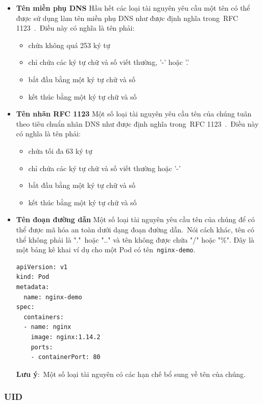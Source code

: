 \documentclass[12pt,a4paper]{report}
\begin{document}
	\begin{itemize}
		\item \textbf{Tên miền phụ DNS}
		\subitem Hầu hết các loại tài nguyên yêu cầu một tên có thể được sử dụng làm tên miền phụ DNS như được định nghĩa trong RFC 1123 . Điều này có nghĩa là tên phải:
		\begin{itemize}
			\item chứa không quá 253 ký tự
			\item chỉ chứa các ký tự chữ và số viết thường, '-' hoặc '.'
			\item bắt đầu bằng một ký tự chữ và số
			\item kết thúc bằng một ký tự chữ và số
		\end{itemize}
	
		\item \textbf{Tên nhãn RFC 1123}
		\subitem Một số loại tài nguyên yêu cầu tên của chúng tuân theo tiêu chuẩn nhãn DNS như được định nghĩa trong RFC 1123 . Điều này có nghĩa là tên phải:
		\begin{itemize}
			\item chứa tối đa 63 ký tự
			\item chỉ chứa các ký tự chữ và số viết thường hoặc '-'
			\item bắt đầu bằng một ký tự chữ và số
			\item kết thúc bằng một ký tự chữ và số
		\end{itemize}
	
		\item \textbf{Tên đoạn đường dẫn}
		\subitem Một số loại tài nguyên yêu cầu tên của chúng để có thể được mã hóa an toàn dưới dạng đoạn đường dẫn. Nói cách khác, tên có thể không phải là "." hoặc ".." và tên không được chứa "/" hoặc "\%".
		\subitem Đây là một bảng kê khai ví dụ cho một Pod có tên \texttt{nginx-demo}.
		\smallskip
\begin{lstlisting}[language=Bash]
apiVersion: v1
kind: Pod
metadata:
  name: nginx-demo
spec:
  containers:
  - name: nginx
    image: nginx:1.14.2
    ports:
    - containerPort: 80
\end{lstlisting}
	\smallskip
	\subitem \textbf{Lưu ý}: Một số loại tài nguyên có các hạn chế bổ sung về tên của chúng.
	\end{itemize}
	
	\subsubsection{UID}
	
	\hspace{1cm}{Một chuỗi do hệ thống Kubernetes tạo để xác định duy nhất các đối tượng.\\}
	
\end{document}

